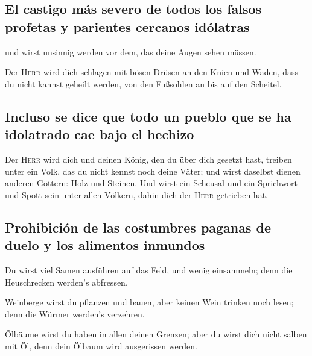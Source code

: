 \hypertarget{el-castigo-muxe1s-severo-de-todos-los-falsos-profetas-y-parientes-cercanos-iduxf3latras}{%
\subsection{El castigo más severo de todos los falsos profetas y
parientes cercanos
idólatras}\label{el-castigo-muxe1s-severo-de-todos-los-falsos-profetas-y-parientes-cercanos-iduxf3latras}}

 und wirst unsinnig werden vor dem, das deine Augen sehen
müssen.

 Der \textsc{Herr} wird dich schlagen mit bösen Drüsen an
den Knien und Waden, dass du nicht kannst geheilt werden, von den
Fußsohlen an bis auf den Scheitel.

\hypertarget{incluso-se-dice-que-todo-un-pueblo-que-se-ha-idolatrado-cae-bajo-el-hechizo}{%
\subsection{Incluso se dice que todo un pueblo que se ha idolatrado cae
bajo el
hechizo}\label{incluso-se-dice-que-todo-un-pueblo-que-se-ha-idolatrado-cae-bajo-el-hechizo}}

 Der \textsc{Herr} wird dich und deinen König, den du
über dich gesetzt hast, treiben unter ein Volk, das du nicht kennst noch
deine Väter; und wirst daselbst dienen anderen Göttern: Holz und
Steinen.  Und wirst ein Scheusal und ein Sprichwort und
Spott sein unter allen Völkern, dahin dich der \textsc{Herr} getrieben
hat.

\hypertarget{prohibiciuxf3n-de-las-costumbres-paganas-de-duelo-y-los-alimentos-inmundos}{%
\subsection{Prohibición de las costumbres paganas de duelo y los
alimentos
inmundos}\label{prohibiciuxf3n-de-las-costumbres-paganas-de-duelo-y-los-alimentos-inmundos}}

 Du wirst viel Samen ausführen auf das Feld, und wenig
einsammeln; denn die Heuschrecken werden's abfressen.

 Weinberge wirst du pflanzen und bauen, aber keinen Wein
trinken noch lesen; denn die Würmer werden's verzehren.

 Ölbäume wirst du haben in allen deinen Grenzen; aber du
wirst dich nicht salben mit Öl, denn dein Ölbaum wird ausgerissen
werden.

